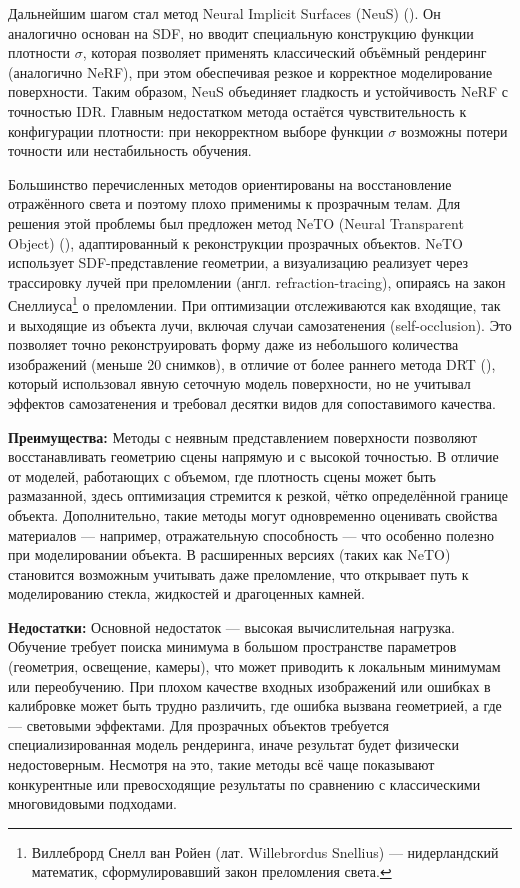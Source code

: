 Дальнейшим шагом стал метод Neural Implicit Surfaces (NeuS)
(\cite{wang2023neuslearningneuralimplicit}). Он аналогично основан на SDF, но вводит
специальную конструкцию функции плотности $\sigma$, которая позволяет применять
классический объёмный рендеринг (аналогично NeRF), при этом обеспечивая резкое и
корректное моделирование поверхности. Таким образом, NeuS объединяет гладкость и
устойчивость NeRF с точностью IDR. Главным недостатком метода остаётся
чувствительность к конфигурации плотности: при некорректном выборе функции
$\sigma$ возможны потери точности или нестабильность обучения.

Большинство перечисленных методов ориентированы на восстановление отражённого
света и поэтому плохо применимы к прозрачным телам. Для решения этой проблемы
был предложен метод NeTO (Neural Transparent Object)
(\cite{li2023netoneuralreconstructiontransparentobjects}), адаптированный к
реконструкции прозрачных объектов. NeTO использует SDF-представление геометрии,
а визуализацию реализует через трассировку
лучей при преломлении (англ. refraction-tracing), опираясь на закон Снеллиуса\footnote{Виллеброрд Снелл ван Ройен (лат.
Willebrordus Snellius) — нидерландский математик, сформулировавший закон
преломления света.} о преломлении. При оптимизации отслеживаются как входящие, так и
выходящие из объекта лучи, включая случаи самозатенения (self-occlusion). Это
позволяет точно реконструировать форму даже из небольшого количества изображений
(меньше 20 снимков), в отличие от более раннего метода DRT
(\cite{Lyu_2020}), который использовал явную сеточную модель поверхности, но не
учитывал эффектов самозатенения и требовал десятки видов для сопоставимого
качества.

\textbf{Преимущества:} Методы с неявным представлением поверхности позволяют
восстанавливать геометрию сцены напрямую и с высокой точностью. В отличие от
моделей, работающих с объемом, где плотность сцены может быть размазанной, здесь
оптимизация стремится к резкой, чётко определённой границе объекта.
Дополнительно, такие методы могут одновременно оценивать свойства материалов —
например, отражательную способность — что особенно полезно при моделировании
объекта. В расширенных версиях (таких как NeTO) становится возможным учитывать
даже преломление, что открывает путь к моделированию стекла, жидкостей и
драгоценных камней.

\textbf{Недостатки:} Основной недостаток — высокая вычислительная нагрузка.
Обучение требует поиска минимума в большом пространстве параметров (геометрия,
освещение, камеры), что может приводить к локальным минимумам или переобучению.
При плохом качестве входных изображений или ошибках в калибровке
может быть трудно различить, где ошибка вызвана геометрией, а где — световыми
эффектами. Для прозрачных объектов требуется специализированная модель
рендеринга, иначе результат будет физически недостоверным. Несмотря на это,
такие методы всё чаще показывают конкурентные или превосходящие результаты по
сравнению с классическими многовидовыми подходами.

